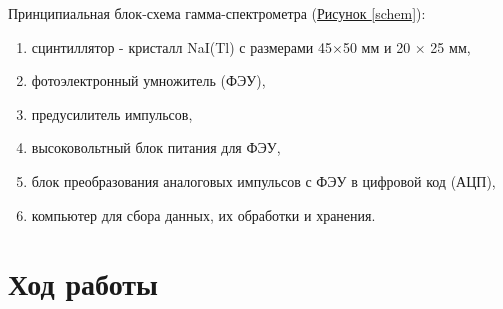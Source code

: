 \documentclass{article}
\begin{document}
Принципиальная блок-схема гамма-спектрометра
(\hyperref[schem]{Рисунок \ref*{schem}}):
\begin{enumerate}
    \item сцинтиллятор - кристалл NaI(Tl) с размерами 45$\times$50 мм и 20 $\times$ 25 мм, 
    \item фотоэлектронный умножитель (ФЭУ), 
    \item предусилитель импульсов, \item высоковольтный блок питания для ФЭУ, 
    \item блок преобразования аналоговых импульсов с ФЭУ в цифровой код (АЦП), 
    \item компьютер для сбора данных, их обработки и хранения.
\end{enumerate}




\section{Ход работы}
\end{document}
